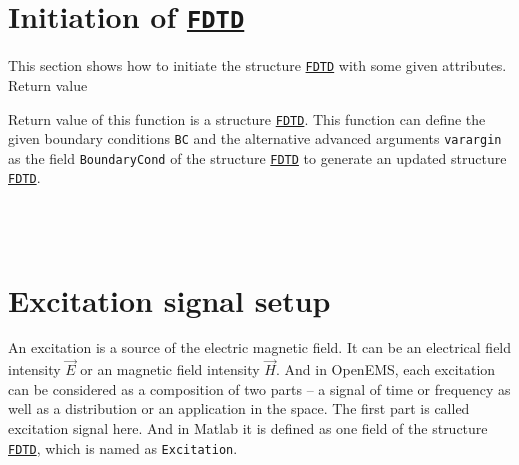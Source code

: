 \section{Initiation of \hyperref[para:FDTD]{\texttt{FDTD}}} \label{sec:FDTD_ATTRIBUTE}
 \label{para:FDTD_ATTRIBUTE}
This section shows how to initiate the structure \hyperref[para:FDTD]{\texttt{FDTD}} with some given attributes. 
	      Return value 
	\begin{myindentpar}
      Return value of this function is a structure \hyperref[para:FDTD]{\texttt{FDTD}}. This function can define the given boundary conditions \texttt{BC} and the alternative advanced arguments \texttt{varargin} as the field \texttt{BoundaryCond} of the structure  \hyperref[para:FDTD]{\texttt{FDTD}} to generate an updated structure \hyperref[para:FDTD]{\texttt{FDTD}}.  
      \end{myindentpar}
	      \\ \\
\section{Excitation signal setup} \label{sec:FDTD_Excitation}
An excitation  is a source of the  electric magnetic field. It can be  an electrical field intensity $\vec{E}$ or an magnetic field intensity $\vec{H}$. And  in OpenEMS, each excitation can be considered as a composition  of two parts -- a signal of  time or  frequency as well as  a distribution or an application in the space. The first part is called excitation signal here. And in Matlab it is defined as one field of the structure \hyperref[para:FDTD]{\texttt{FDTD}}, which is named as \texttt{Excitation}.  \label{para:Excitation}\\%


